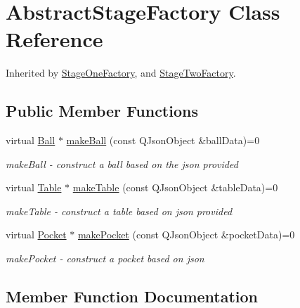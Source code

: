\hypertarget{class_abstract_stage_factory}{}\section{Abstract\+Stage\+Factory Class Reference}
\label{class_abstract_stage_factory}


Inherited by \mbox{\hyperlink{class_stage_one_factory}{Stage\+One\+Factory}}, and \mbox{\hyperlink{class_stage_two_factory}{Stage\+Two\+Factory}}.

\subsection*{Public Member Functions}
\begin{DoxyCompactItemize}
\item 
virtual \mbox{\hyperlink{class_ball}{Ball}} $\ast$ \mbox{\hyperlink{class_abstract_stage_factory_a23367d64366e679aaff865620f5ce1ab}{make\+Ball}} (const Q\+Json\+Object \&ball\+Data)=0
\begin{DoxyCompactList}\small\item\em make\+Ball -\/ construct a ball based on the json provided \end{DoxyCompactList}\item 
virtual \mbox{\hyperlink{class_table}{Table}} $\ast$ \mbox{\hyperlink{class_abstract_stage_factory_a539c855ce9a09e08b7fcb3ffa7f0d3fd}{make\+Table}} (const Q\+Json\+Object \&table\+Data)=0
\begin{DoxyCompactList}\small\item\em make\+Table -\/ construct a table based on json provided \end{DoxyCompactList}\item 
virtual \mbox{\hyperlink{class_pocket}{Pocket}} $\ast$ \mbox{\hyperlink{class_abstract_stage_factory_a6ce57859e00b135049e3b995b7dfc94d}{make\+Pocket}} (const Q\+Json\+Object \&pocket\+Data)=0
\begin{DoxyCompactList}\small\item\em make\+Pocket -\/ construct a pocket based on json \end{DoxyCompactList}\end{DoxyCompactItemize}


\subsection{Member Function Documentation}
\mbox{\label{class_abstract_stage_factory_a23367d64366e679aaff865620f5ce1ab}} 
